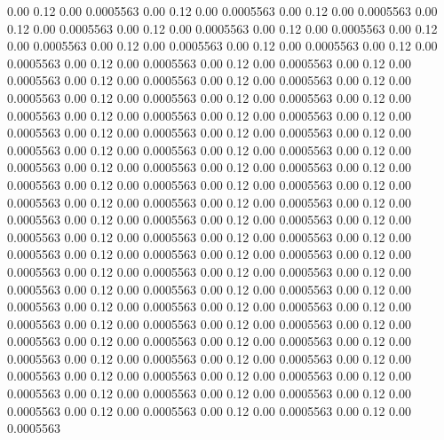    0.00    0.12    0.00   0.0005563
   0.00    0.12    0.00   0.0005563
   0.00    0.12    0.00   0.0005563
   0.00    0.12    0.00   0.0005563
   0.00    0.12    0.00   0.0005563
   0.00    0.12    0.00   0.0005563
   0.00    0.12    0.00   0.0005563
   0.00    0.12    0.00   0.0005563
   0.00    0.12    0.00   0.0005563
   0.00    0.12    0.00   0.0005563
   0.00    0.12    0.00   0.0005563
   0.00    0.12    0.00   0.0005563
   0.00    0.12    0.00   0.0005563
   0.00    0.12    0.00   0.0005563
   0.00    0.12    0.00   0.0005563
   0.00    0.12    0.00   0.0005563
   0.00    0.12    0.00   0.0005563
   0.00    0.12    0.00   0.0005563
   0.00    0.12    0.00   0.0005563
   0.00    0.12    0.00   0.0005563
   0.00    0.12    0.00   0.0005563
   0.00    0.12    0.00   0.0005563
   0.00    0.12    0.00   0.0005563
   0.00    0.12    0.00   0.0005563
   0.00    0.12    0.00   0.0005563
   0.00    0.12    0.00   0.0005563
   0.00    0.12    0.00   0.0005563
   0.00    0.12    0.00   0.0005563
   0.00    0.12    0.00   0.0005563
   0.00    0.12    0.00   0.0005563
   0.00    0.12    0.00   0.0005563
   0.00    0.12    0.00   0.0005563
   0.00    0.12    0.00   0.0005563
   0.00    0.12    0.00   0.0005563
   0.00    0.12    0.00   0.0005563
   0.00    0.12    0.00   0.0005563
   0.00    0.12    0.00   0.0005563
   0.00    0.12    0.00   0.0005563
   0.00    0.12    0.00   0.0005563
   0.00    0.12    0.00   0.0005563
   0.00    0.12    0.00   0.0005563
   0.00    0.12    0.00   0.0005563
   0.00    0.12    0.00   0.0005563
   0.00    0.12    0.00   0.0005563
   0.00    0.12    0.00   0.0005563
   0.00    0.12    0.00   0.0005563
   0.00    0.12    0.00   0.0005563
   0.00    0.12    0.00   0.0005563
   0.00    0.12    0.00   0.0005563
   0.00    0.12    0.00   0.0005563
   0.00    0.12    0.00   0.0005563
   0.00    0.12    0.00   0.0005563
   0.00    0.12    0.00   0.0005563
   0.00    0.12    0.00   0.0005563
   0.00    0.12    0.00   0.0005563
   0.00    0.12    0.00   0.0005563
   0.00    0.12    0.00   0.0005563
   0.00    0.12    0.00   0.0005563
   0.00    0.12    0.00   0.0005563
   0.00    0.12    0.00   0.0005563
   0.00    0.12    0.00   0.0005563
   0.00    0.12    0.00   0.0005563
   0.00    0.12    0.00   0.0005563
   0.00    0.12    0.00   0.0005563
   0.00    0.12    0.00   0.0005563
   0.00    0.12    0.00   0.0005563
   0.00    0.12    0.00   0.0005563
   0.00    0.12    0.00   0.0005563
   0.00    0.12    0.00   0.0005563
   0.00    0.12    0.00   0.0005563
   0.00    0.12    0.00   0.0005563
   0.00    0.12    0.00   0.0005563
   0.00    0.12    0.00   0.0005563
